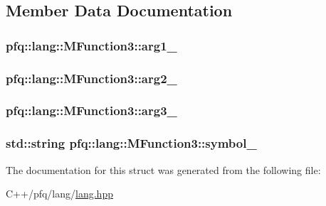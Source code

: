 \subsection{Member Data Documentation}
\hypertarget{structpfq_1_1lang_1_1MFunction3_a992b900c67a4a0398e2c84916fbce35f}{
\subsubsection[{arg1\+\_\+}]{ pfq\+::lang\+::\+M\+Function3\+::arg1\+\_\+}}\label{structpfq_1_1lang_1_1MFunction3_a992b900c67a4a0398e2c84916fbce35f}
\hypertarget{structpfq_1_1lang_1_1MFunction3_a406f1ce0539a6707e79ea0893c8c6edd}{
\subsubsection[{arg2\+\_\+}]{ pfq\+::lang\+::\+M\+Function3\+::arg2\+\_\+}}\label{structpfq_1_1lang_1_1MFunction3_a406f1ce0539a6707e79ea0893c8c6edd}
\hypertarget{structpfq_1_1lang_1_1MFunction3_a8f9f1b512c22a9a4589cce7c41e98d6f}{
\subsubsection[{arg3\+\_\+}]{ pfq\+::lang\+::\+M\+Function3\+::arg3\+\_\+}}\label{structpfq_1_1lang_1_1MFunction3_a8f9f1b512c22a9a4589cce7c41e98d6f}
\hypertarget{structpfq_1_1lang_1_1MFunction3_a4e17f4bb1eba6f141896f2cc0e729451}{
\subsubsection[{symbol\+\_\+}]{\setlength{\rightskip}{0pt plus 5cm}std\+::string pfq\+::lang\+::\+M\+Function3\+::symbol\+\_\+}}\label{structpfq_1_1lang_1_1MFunction3_a4e17f4bb1eba6f141896f2cc0e729451}


The documentation for this struct was generated from the following file\+:\begin{DoxyCompactItemize}
\item 
C++/pfq/lang/\hyperlink{lang_8hpp}{lang.\+hpp}\end{DoxyCompactItemize}
